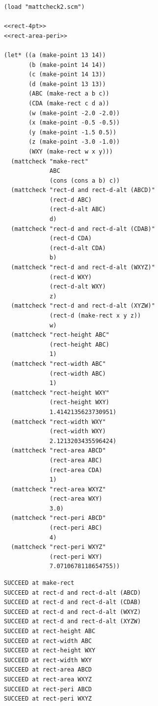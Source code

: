 \documentclass[final,fleqn,titlepage,twoside]{article}
\begin{document}
\begin{verbatim}
(load "mattcheck2.scm")

<<rect-4pt>>
<<rect-area-peri>>

(let* ((a (make-point 13 14))
       (b (make-point 14 14))
       (c (make-point 14 13))
       (d (make-point 13 13))
       (ABC (make-rect a b c))
       (CDA (make-rect c d a))
       (w (make-point -2.0 -2.0))
       (x (make-point -0.5 -0.5))
       (y (make-point -1.5 0.5))
       (z (make-point -3.0 -1.0))
       (WXY (make-rect w x y)))
  (mattcheck "make-rect"
             ABC
             (cons (cons a b) c))
  (mattcheck "rect-d and rect-d-alt (ABCD)"
             (rect-d ABC)
             (rect-d-alt ABC)
             d)
  (mattcheck "rect-d and rect-d-alt (CDAB)"
             (rect-d CDA)
             (rect-d-alt CDA)
             b)
  (mattcheck "rect-d and rect-d-alt (WXYZ)"
             (rect-d WXY)
             (rect-d-alt WXY)
             z)
  (mattcheck "rect-d and rect-d-alt (XYZW)"
             (rect-d (make-rect x y z))
             w)
  (mattcheck "rect-height ABC"
             (rect-height ABC)
             1)
  (mattcheck "rect-width ABC"
             (rect-width ABC)
             1)
  (mattcheck "rect-height WXY"
             (rect-height WXY)
             1.4142135623730951)
  (mattcheck "rect-width WXY"
             (rect-width WXY)
             2.1213203435596424)
  (mattcheck "rect-area ABCD"
             (rect-area ABC)
             (rect-area CDA)
             1)
  (mattcheck "rect-area WXYZ"
             (rect-area WXY)
             3.0)
  (mattcheck "rect-peri ABCD"
             (rect-peri ABC)
             4)
  (mattcheck "rect-peri WXYZ"
             (rect-peri WXY)
             7.0710678118654755))
\end{verbatim}

\begin{verbatim}
SUCCEED at make-rect
SUCCEED at rect-d and rect-d-alt (ABCD)
SUCCEED at rect-d and rect-d-alt (CDAB)
SUCCEED at rect-d and rect-d-alt (WXYZ)
SUCCEED at rect-d and rect-d-alt (XYZW)
SUCCEED at rect-height ABC
SUCCEED at rect-width ABC
SUCCEED at rect-height WXY
SUCCEED at rect-width WXY
SUCCEED at rect-area ABCD
SUCCEED at rect-area WXYZ
SUCCEED at rect-peri ABCD
SUCCEED at rect-peri WXYZ
\end{verbatim}
\end{document}
